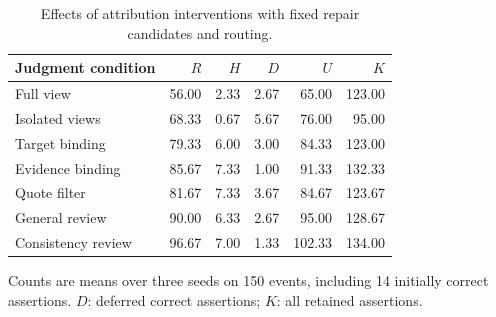 \begin{table}[t]
\centering
\small
\caption{Effects of attribution interventions with fixed repair candidates and routing.}
\label{tab:attribution}
\begin{tabular}{lrrrrr}
\toprule
Judgment condition & $R$ & $H$ & $D$ & $U$ & $K$ \\
\midrule
Full view & 56.00 & 2.33 & 2.67 & 65.00 & 123.00 \\
Isolated views & 68.33 & 0.67 & 5.67 & 76.00 & 95.00 \\
Target binding & 79.33 & 6.00 & 3.00 & 84.33 & 123.00 \\
Evidence binding & 85.67 & 7.33 & 1.00 & 91.33 & 132.33 \\
Quote filter & 81.67 & 7.33 & 3.67 & 84.67 & 123.67 \\
General review & 90.00 & 6.33 & 2.67 & 95.00 & 128.67 \\
Consistency review & 96.67 & 7.00 & 1.33 & 102.33 & 134.00 \\
\bottomrule
\end{tabular}
\par\smallskip
\begin{minipage}{\linewidth}
\footnotesize
Counts are means over three seeds on 150 events, including 14 initially correct assertions. $D$: deferred correct assertions; $K$: all retained assertions.
\end{minipage}
\end{table}
